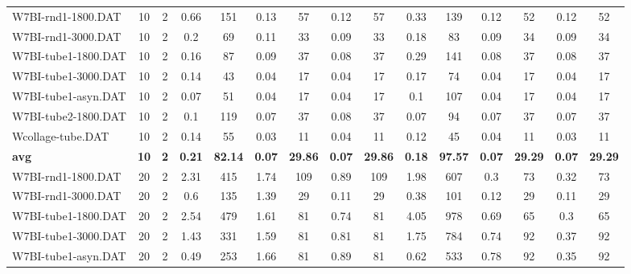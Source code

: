 \begin{table}[!ht]
{\begin{tabular}{lcccccccccccccc}
W7BI-rnd1-1800.DAT & 10 & 2 & 0.66 & 151 & 0.13 & 57 &  \textcolor{blue2}{0.12} & 57 & 0.33 & 139 &  \textcolor{blue2}{0.12} & 52 &  \textcolor{blue2}{0.12} & 52 \\
W7BI-rnd1-3000.DAT & 10 & 2 & 0.2 & 69 & 0.11 & 33 &  \textcolor{blue2}{0.09} & 33 & 0.18 & 83 &  \textcolor{blue2}{0.09} & 34 &  \textcolor{blue2}{0.09} & 34 \\
W7BI-tube1-1800.DAT & 10 & 2 & 0.16 & 87 & 0.09 & 37 &  \textcolor{blue2}{0.08} & 37 & 0.29 & 141 &  \textcolor{blue2}{0.08} & 37 &  \textcolor{blue2}{0.08} & 37 \\
W7BI-tube1-3000.DAT & 10 & 2 & 0.14 & 43 &  \textcolor{blue2}{0.04} & 17 &  \textcolor{blue2}{0.04} & 17 & 0.17 & 74 &  \textcolor{blue2}{0.04} & 17 &  \textcolor{blue2}{0.04} & 17 \\
W7BI-tube1-asyn.DAT & 10 & 2 & 0.07 & 51 &  \textcolor{blue2}{0.04} & 17 &  \textcolor{blue2}{0.04} & 17 & 0.1 & 107 &  \textcolor{blue2}{0.04} & 17 &  \textcolor{blue2}{0.04} & 17 \\
W7BI-tube2-1800.DAT & 10 & 2 & 0.1 & 119 &  \textcolor{blue2}{0.07} & 37 & 0.08 & 37 &  \textcolor{blue2}{0.07} & 94 &  \textcolor{blue2}{0.07} & 37 &  \textcolor{blue2}{0.07} & 37 \\
Wcollage-tube.DAT & 10 & 2 & 0.14 & 55 &  \textcolor{blue2}{0.03} & 11 & 0.04 & 11 & 0.12 & 45 & 0.04 & 11 &  \textcolor{blue2}{0.03} & 11 \\
\cline{1-15} \textbf{avg} & \textbf{10} & \textbf{2} & \textbf{0.21} & \textbf{82.14} & \textbf{0.07} & \textbf{29.86} & \textbf{0.07} & \textbf{29.86} & \textbf{0.18} & \textbf{97.57} & \textbf{0.07} & \textbf{29.29} & \textbf{0.07} & \textbf{29.29} \\ \cline{1-15}
W7BI-rnd1-1800.DAT & 20 & 2 & 2.31 & 415 & 1.74 & 109 & 0.89 & 109 & 1.98 & 607 &  \textcolor{blue2}{0.3} & 73 & 0.32 & 73 \\
W7BI-rnd1-3000.DAT & 20 & 2 & 0.6 & 135 & 1.39 & 29 &  \textcolor{blue2}{0.11} & 29 & 0.38 & 101 & 0.12 & 29 &  \textcolor{blue2}{0.11} & 29 \\
W7BI-tube1-1800.DAT & 20 & 2 & 2.54 & 479 & 1.61 & 81 & 0.74 & 81 & 4.05 & 978 & 0.69 & 65 &  \textcolor{blue2}{0.3} & 65 \\
W7BI-tube1-3000.DAT & 20 & 2 & 1.43 & 331 & 1.59 & 81 & 0.81 & 81 & 1.75 & 784 & 0.74 & 92 &  \textcolor{blue2}{0.37} & 92 \\
W7BI-tube1-asyn.DAT & 20 & 2 & 0.49 & 253 & 1.66 & 81 & 0.89 & 81 & 0.62 & 533 & 0.78 & 92 &  \textcolor{blue2}{0.35} & 92 \\

\end{tabular}}
\end{table}
